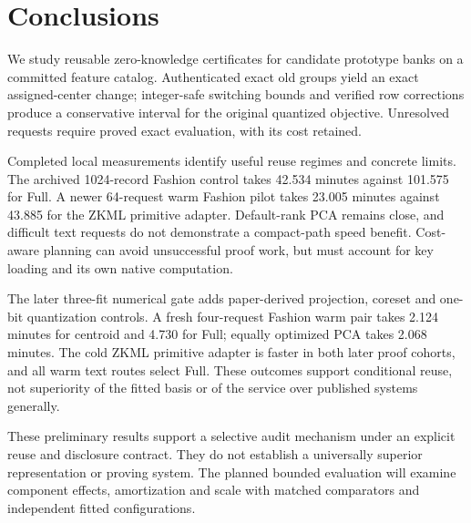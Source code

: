 \section{Conclusions}
\label{sec:conclusion}
We study reusable zero-knowledge certificates for candidate prototype banks
on a committed feature catalog. Authenticated exact old groups yield an
exact assigned-center change; integer-safe switching bounds and verified
row corrections produce a conservative interval for the original quantized
objective. Unresolved requests require proved exact evaluation, with its
cost retained.

Completed local measurements identify useful reuse regimes and concrete
limits. The archived 1024-record Fashion control takes 42.534 minutes against
101.575 for Full. A newer 64-request warm Fashion pilot takes 23.005 minutes
against 43.885 for the ZKML primitive adapter. Default-rank PCA remains close,
and difficult text requests do not demonstrate a compact-path speed benefit.
Cost-aware planning can avoid unsuccessful proof work, but must account for
key loading and its own native computation.

The later three-fit numerical gate adds paper-derived projection, coreset
and one-bit quantization controls. A fresh four-request Fashion warm pair
takes 2.124 minutes for centroid and 4.730 for Full; equally optimized PCA
takes 2.068 minutes. The cold ZKML primitive adapter is faster in both
later proof cohorts, and all warm text routes select Full. These outcomes
support conditional reuse, not superiority of the fitted basis or of the
service over published systems generally.

These preliminary results support a selective audit mechanism under an
explicit reuse and disclosure contract. They do not establish a universally
superior representation or proving system. The planned bounded evaluation
will examine component effects, amortization and scale with matched
comparators and independent fitted configurations.

